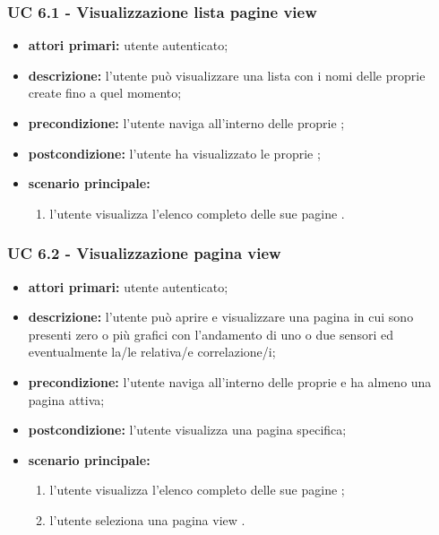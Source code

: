 			\subsubsection{UC 6.1 - Visualizzazione lista pagine view}
			\begin{itemize}
				\item \textbf{attori primari:} utente autenticato;
				\item \textbf{descrizione:} l'utente può visualizzare una lista con i nomi delle proprie  create fino a quel momento;
				\item \textbf{precondizione:} l'utente naviga all'interno delle proprie ;
				\item \textbf{postcondizione:} l'utente ha visualizzato le proprie ;
				\item \textbf{scenario principale:}
				\begin{enumerate}
					\item{l'utente visualizza l'elenco completo delle sue pagine .}
				\end{enumerate}
			\end{itemize}

			\subsubsection{UC 6.2 - Visualizzazione pagina view}
			\begin{itemize}
				\item \textbf{attori primari:} utente autenticato;
				\item \textbf{descrizione:} l'utente può aprire e visualizzare una pagina  in cui sono presenti zero o più grafici con l'andamento di uno o due sensori ed eventualmente la/le relativa/e correlazione/i;
				\item \textbf{precondizione:} l'utente naviga all'interno delle proprie  e ha almeno una pagina  attiva;
				\item \textbf{postcondizione:} l'utente visualizza una pagina  specifica;
				\item \textbf{scenario principale:}
				\begin{enumerate}
					\item{l'utente visualizza l'elenco completo delle sue pagine ;}
					\item{l'utente seleziona una pagina view .}
				\end{enumerate}
			\end{itemize}

